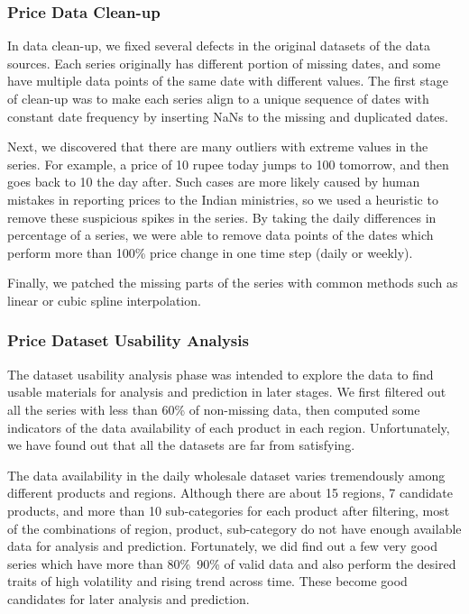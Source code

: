 \subsubsection*{Price Data Clean-up}
In data clean-up, we fixed several defects in the original datasets of the data sources. Each series originally has different portion of missing dates, and some have multiple data points of the same date with different values. The first stage of clean-up was to make each series align to a unique sequence of dates with constant date frequency by inserting NaNs to the missing and duplicated dates.

Next, we discovered that there are many outliers with extreme values in the series. For example, a price of 10 rupee today jumps to 100 tomorrow, and then goes back to 10 the day after. Such cases are more likely caused by human mistakes in reporting prices to the Indian ministries, so we used a heuristic to remove these suspicious spikes in the series. By taking the daily differences in percentage of a series, we were able to remove data points of the dates which perform more than 100\% price change in one time step (daily or weekly).

Finally, we patched the missing parts of the series with common methods such as linear or cubic spline interpolation.

\subsubsection*{Price Dataset Usability Analysis}

The dataset usability analysis phase was intended to explore the data to find usable materials for analysis and prediction in later stages. We first filtered out all the series with less than 60\% of non-missing data, then computed some indicators of the data availability of each product in each region. Unfortunately, we have found out that all the datasets are far from satisfying.

The data availability in the daily wholesale dataset varies tremendously among different products and regions. Although there are about 15 regions, 7 candidate products, and more than 10 sub-categories for each product after filtering, most of the combinations of region, product, sub-category do not have enough available data for analysis and prediction. Fortunately, we did find out a few very good series which have more than 80\%~90\% of valid data and also perform the desired traits of high volatility and rising trend across time. These become good candidates for later analysis and prediction.

